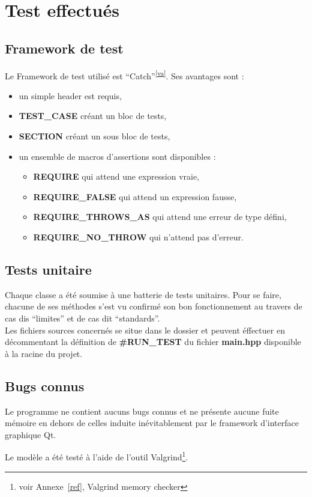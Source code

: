 \documentclass[a4paper,11pt]{report}
\begin{document}
\chapter{Test effectués}
\section{Framework de test}
Le Framework de test utilisé est
``Catch''\textsuperscript{\ref{va}}. Ses avantages
sont :
\begin{itemize}
	\item un simple header est requis,
	\item \textbf{TEST\_CASE} créant un bloc de tests,
	\item \textbf{SECTION} créant un sous bloc de tests,
	\item un ensemble de macros d'assertions sont disponibles :
		\begin{itemize}
			\item\textbf{REQUIRE} qui attend une expression vraie,
			\item\textbf{REQUIRE\_FALSE} qui attend un expression fausse,
			\item\textbf{REQUIRE\_THROWS\_AS} qui attend une erreur de type défini,
			\item\textbf{REQUIRE\_NO\_THROW} qui n'attend pas d'erreur.
		\end{itemize}
\end{itemize} 
\section{Tests unitaire}
Chaque classe a été soumise à une batterie de tests unitaires. Pour se faire,
chacune de ses méthodes s'est vu confirmé son bon fonctionnement au travers de
cas dis ``limites'' et de cas dit ``standards''. \\

Les fichiers sources concernés se situe dans le dossier  et peuvent
éffectuer en décommentant la définition de \textbf{\#RUN\_TEST} du fichier
\textbf{main.hpp} disponible à la racine du projet.
\section{Bugs connus}
\begin{center}
	Le programme ne contient aucuns bugs connus et ne présente aucune fuite
	mémoire en dehors de celles induite inévitablement par le framework
	d'interface graphique Qt.

Le modèle a été testé à l'aide de l'outil Valgrind\footnote{voir Annexe~\ref{ref},
Valgrind memory checker}.
\end{center}
\newpage
\end{document}
